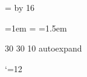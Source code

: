 \newdimen\logobarthickness
\logobarthickness=\logofont
\divide\logobarthickness by 16
\def\logolineskip{\vskip4\logobarthickness}

\def\stackedlogo#1#2{%
  \begingroup%
  \offinterlineskip%
  \logofont%
  \setbox0=\hbox{DRISCOLL}%
  \vbox{%
    \hrule height \logobarthickness%
    \logolineskip%
    \copy0%
    \logolineskip%
    \hbox to \wd0{#1BROOK#2}%
    \logolineskip%
    \hbox to \wd0{#1PRESS#2}%
    \logolineskip%
    \hrule height \logobarthickness%
  }%
  \endgroup%
}

\def\leftlogo{\stackedlogo{}{\hss}}
\def\centerlogo{\stackedlogo{\hss}{\hss}}
\def\rightlogo{\stackedlogo{\hss}{}}

\def\linelogo{%
  \begingroup%
  \offinterlineskip%
  \logofont%
  \vbox{%
    \hrule height \logobarthickness%
    \logolineskip%
    \hbox{DRISCOLL BROOK PRESS}%
    \logolineskip%
    \hrule height \logobarthickness%
  }%
  \endgroup%
}

%
%

\def\raggedleft{\parindent=0pt\parfillskip=0pt\leftskip=0pt plus \hsize\relax}
\def\raggedright{\parindent=0pt\parfillskip=0pt\rightskip=0pt plus \hsize\relax}
\def\centered{\raggedleft\raggedright}
\newdimen\leading \leading=15pt

\def\authorinfoheading#1{\bigskip\bigskip{\sc\centered#1\par}}
\def\authorinfoitem#1{\medskip{\centered#1\par}}
\def\connect#1#2{\authorinfoheading{#1}\authorinfoitem{#2}}
\def\genre#1{\authorinfoheading{#1}}
\def\genrebook#1{\authorinfoitem{#1}}

\def\titlespacing{\linespacing{1.1}}

\def\linespacing#1{\baselineskip=#1\fontdimen6\the\font}

\parindent=1em
\normalbaselineskip=\leading
\normalbaselines
\emergencystretch=1.5em


%
%

\def\emph#1{{\it #1}}
\def\leadin#1{\nobreak\noindent{\sc #1}}
\rm

%
%

\pdffontexpand\rm 30 30 10 autoexpand

\catcode`\@=12
